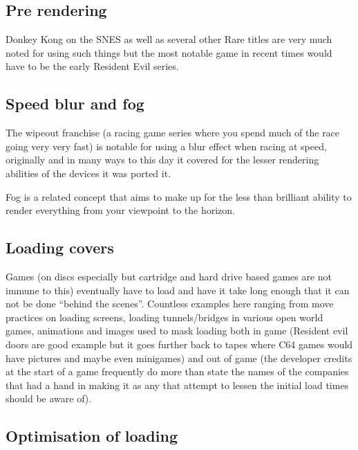 \documentclass[
]{book}
\begin{document}
\hypertarget{pre-rendering}{%
\subsection{Pre rendering}\label{pre-rendering}}

Donkey Kong on the SNES as well as several other Rare titles are very much noted for using such things but the most notable game in recent times would have to be the early Resident Evil series.

\hypertarget{speed-blur-and-fog}{%
\subsection{Speed blur and fog}\label{speed-blur-and-fog}}

The wipeout franchise (a racing game series where you spend much of the race going very very fast) is notable for using a blur effect when racing at speed, originally and in many ways to this day it covered for the lesser rendering abilities of the devices it was ported it.

Fog is a related concept that aims to make up for the less than brilliant ability to render everything from your viewpoint to the horizon.

\hypertarget{loading-covers}{%
\subsection{Loading covers}\label{loading-covers}}

Games (on discs especially but cartridge and hard drive based games are not immune to this) eventually have to load and have it take long enough that it can not be done ``behind the scenes''. Countless examples here ranging from move practices on loading screens, loading tunnels/bridges in various open world games, animations and images used to mask loading both in game (Resident evil doors are good example but it goes further back to tapes where C64 games would have pictures and maybe even minigames) and out of game (the developer credits at the start of a game frequently do more than state the names of the companies that had a hand in making it as any that attempt to lessen the initial load times should be aware of).

\hypertarget{optimisation-of-loading}{%
\subsection{Optimisation of loading}\label{optimisation-of-loading}}
\end{document}
